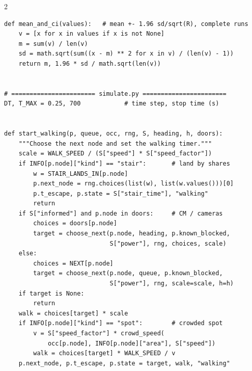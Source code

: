 \documentclass[10pt]{article}
\begin{document}
\begin{multicols*}{2}
\begin{lstlisting}
def mean_and_ci(values):   # mean +- 1.96 sd/sqrt(R), complete runs
    v = [x for x in values if x is not None]
    m = sum(v) / len(v)
    sd = math.sqrt(sum((x - m) ** 2 for x in v) / (len(v) - 1))
    return m, 1.96 * sd / math.sqrt(len(v))


# ======================= simulate.py =======================
DT, T_MAX = 0.25, 700            # time step, stop time (s)


def start_walking(p, queue, occ, rng, S, heading, h, doors):
    """Choose the next node and set the walking timer."""
    scale = WALK_SPEED / (S["speed"] * S["speed_factor"])
    if INFO[p.node]["kind"] == "stair":       # land by shares
        w = STAIR_LANDS_IN[p.node]
        p.next_node = rng.choices(list(w), list(w.values()))[0]
        p.t_escape, p.state = S["stair_time"], "walking"
        return
    if S["informed"] and p.node in doors:     # CM / cameras
        choices = doors[p.node]
        target = choose_next(p.node, heading, p.known_blocked,
                             S["power"], rng, choices, scale)
    else:
        choices = NEXT[p.node]
        target = choose_next(p.node, queue, p.known_blocked,
                             S["power"], rng, scale=scale, h=h)
    if target is None:
        return
    walk = choices[target] * scale
    if INFO[p.node]["kind"] == "spot":        # crowded spot
        v = S["speed_factor"] * crowd_speed(
            occ[p.node], INFO[p.node]["area"], S["speed"])
        walk = choices[target] * WALK_SPEED / v
    p.next_node, p.t_escape, p.state = target, walk, "walking"



\end{lstlisting}
\end{multicols*}
\end{document}
